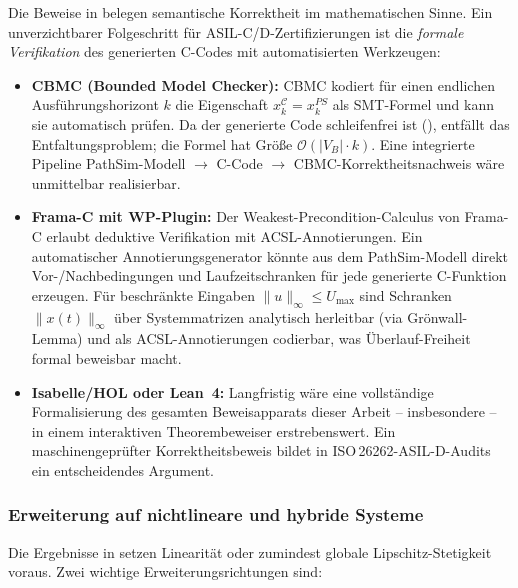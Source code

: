 ﻿\documentclass[12pt,a4paper]{article}
\theoremstyle{definition}
\begin{document}
Die Beweise in  belegen semantische Korrektheit im
mathematischen Sinne. Ein unverzichtbarer Folgeschritt für
ASIL-C/D-Zertifizierungen ist die \emph{formale Verifikation} des
generierten C-Codes mit automatisierten Werkzeugen:

\begin{itemize}
  \item \textbf{CBMC (Bounded Model Checker):} CBMC kodiert für einen
        endlichen Ausführungshorizont $k$ die Eigenschaft
        $x_k^\mathcal{C} = x_k^{PS}$ als SMT-Formel und kann sie
        automatisch prüfen. Da der generierte Code schleifenfrei ist
        (), entfällt das Entfaltungsproblem; die Formel
        hat Größe $\mathcal{O}(|V_B| \cdot k)$. Eine integrierte
        Pipeline PathSim-Modell $\to$ C-Code $\to$ CBMC-Korrektheitsnachweis
        wäre unmittelbar realisierbar.

  \item \textbf{Frama-C mit WP-Plugin:} Der Weakest-Precondition-Calculus
        von Frama-C erlaubt deduktive Verifikation mit ACSL-Annotierungen.
        Ein automatischer Annotierungsgenerator könnte aus dem PathSim-Modell
        direkt Vor-/Nachbedingungen und Laufzeitschranken für jede generierte
        C-Funktion erzeugen. Für beschränkte Eingaben
        $\|u\|_\infty \leq U_{\max}$ sind Schranken $\|x(t)\|_\infty$
        über Systemmatrizen analytisch herleitbar (via Grönwall-Lemma) und
        als ACSL-Annotierungen codierbar, was Überlauf-Freiheit formal
        beweisbar macht.

  \item \textbf{Isabelle/HOL oder Lean~4:} Langfristig wäre eine
        vollständige Formalisierung des gesamten Beweisapparats dieser
        Arbeit -- insbesondere
         -- in
        einem interaktiven Theorembeweiser erstrebenswert. Ein
        maschinengeprüfter Korrektheitsbeweis bildet in
        ISO\,26262-ASIL-D-Audits ein entscheidendes Argument.
\end{itemize}

\subsubsection{Erweiterung auf nichtlineare und hybride Systeme}

Die Ergebnisse in  setzen Linearität oder
zumindest globale Lipschitz-Stetigkeit voraus. Zwei wichtige
Erweiterungsrichtungen sind:
\end{document}
